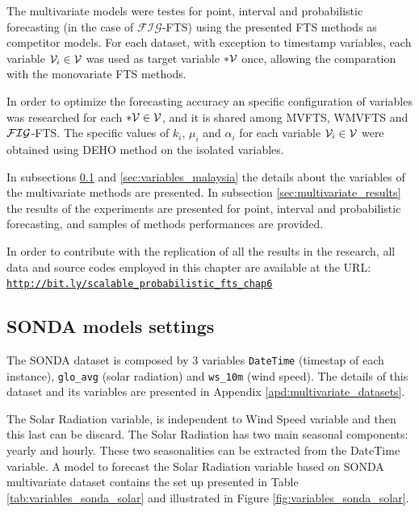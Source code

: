 The multivariate models were testes for point, interval and probabilistic forecasting (in the case of $\mathcal{FIG}$-FTS) using the presented FTS methods as competitor models. For each dataset, with exception to timestamp variables, each variable $\mathcal{V}_i \in \mathcal{V}$ was used as target variable $*\mathcal{V}$ once, allowing the comparation with the monovariate FTS methods. 

In order to optimize the forecasting accuracy an specific configuration of variables was researched for each $*\mathcal{V} \in \mathcal{V}$, and it is shared among MVFTS, WMVFTS and  $\mathcal{FIG}$-FTS. The specific values of $k_i$, $\mu_i$ and $\alpha_i$ for each variable $\mathcal{V}_i \in \mathcal{V}$ were obtained using DEHO method on the isolated variables.

In subsections \ref{sec:variables_sonda} and \ref{sec:variables_malaysia} the details about the variables of the multivariate methods are presented. In subsection \ref{sec:multivariate_results} the results of the experiments are presented for point, interval and probabilistic forecasting, and samples of methods performances are provided.

In order to contribute with the replication of all the results in the research, all data and source codes employed in this chapter are available at the URL:
\texttt{\url{http://bit.ly/scalable_probabilistic_fts_chap6}}

\subsection{SONDA models settings}
\label{sec:variables_sonda}

The SONDA dataset is composed by 3 variables \texttt{DateTime} (timestap of each instance), \texttt{glo\_avg} (solar radiation) and \texttt{ws\_10m} (wind speed). The details of this dataset and its variables are presented in Appendix \ref{apd:multivariate_datasets}. 

The Solar Radiation variable, is independent to Wind Speed variable and then this last can be discard. The Solar Radiation has two main seasonal components: yearly and hourly. These two seasonalities can be extracted from the DateTime variable.  A model to forecast the Solar Radiation variable based on SONDA  multivariate dataset contains the set up presented in Table \ref{tab:variables_sonda_solar} and illustrated in Figure \ref{fig:variables_sonda_solar}.

